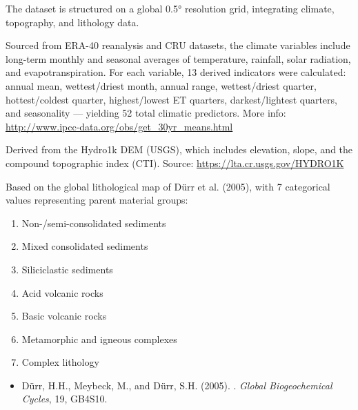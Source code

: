 \documentclass[a4paper]{book}
\begin{document}
%
\begin{Details}
The dataset is structured on a global 0.5° resolution grid, integrating climate, topography, and lithology data.

 Sourced from ERA-40 reanalysis and CRU datasets, the climate variables include long-term monthly and seasonal averages of temperature, rainfall, solar radiation, and evapotranspiration. For each variable, 13 derived indicators were calculated: annual mean, wettest/driest month, annual range, wettest/driest quarter, hottest/coldest quarter, highest/lowest ET quarters, darkest/lightest quarters, and seasonality — yielding 52 total climatic predictors. More info: \url{http://www.ipcc-data.org/obs/get_30yr_means.html}

 Derived from the Hydro1k DEM (USGS), which includes elevation, slope, and the compound topographic index (CTI). Source: \url{https://lta.cr.usgs.gov/HYDRO1K}

 Based on the global lithological map of Dürr et al. (2005), with 7 categorical values representing parent material groups:
\begin{enumerate}

\item{} Non-/semi-consolidated sediments
\item{} Mixed consolidated sediments
\item{} Siliciclastic sediments
\item{} Acid volcanic rocks
\item{} Basic volcanic rocks
\item{} Metamorphic and igneous complexes
\item{} Complex lithology

\end{enumerate}

\end{Details}
%
\begin{References}
\begin{itemize}

\item{} Dürr, H.H., Meybeck, M., and Dürr, S.H. (2005). . \emph{Global Biogeochemical Cycles}, 19, GB4S10.

\end{itemize}

\end{References}
\end{document}
